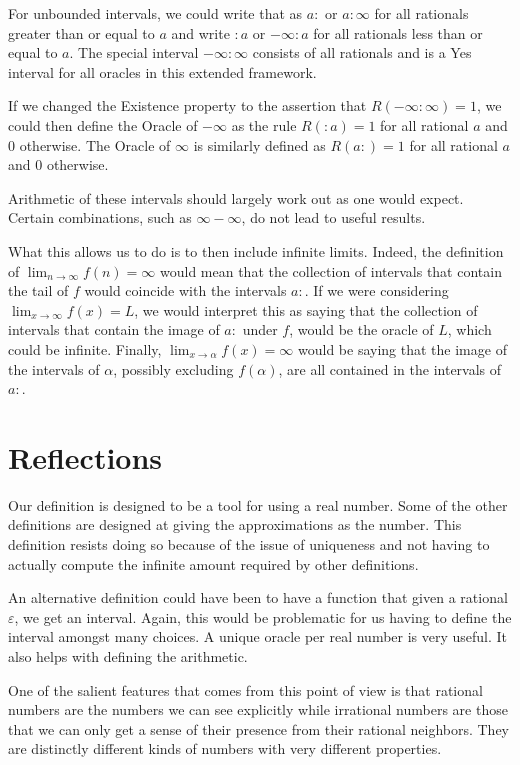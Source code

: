 \documentclass[12pt]{article}
\theoremstyle{remark}
\begin{document}
For unbounded intervals, we could write that as $a:$ or $a:\infty$ for all rationals greater than or equal to $a$ and write $:a$ or $-\infty:a$ for all rationals less than or equal to $a$. The special interval $-\infty:\infty$ consists of all rationals and is a Yes interval for all oracles in this extended framework. 

If we changed the Existence property to the assertion that $R(-\infty:\infty)=1$, we could then define the Oracle of $-\infty$ as the rule $R(:a) = 1$ for all rational $a$ and 0 otherwise. The Oracle of $\infty$ is similarly defined as $R(a:)=1$  for all rational $a$ and 0 otherwise. 

Arithmetic of these intervals should largely work out as one would expect. Certain combinations, such as $\infty-\infty$, do not lead to useful results. 

What this allows us to do is to then include infinite limits. Indeed, the definition of $\lim_{n\to \infty} f(n) = \infty$ would mean that the collection of intervals that contain the tail of $f$ would coincide with the intervals $a:$. If we were considering $\lim_{x \to \infty} f(x) = L$, we would interpret this as saying that the collection of intervals that contain the image of $a:$ under $f$, would be the oracle of $L$, which could be infinite.  Finally, $\lim_{x \to \alpha} f(x) = \infty$ would be saying that the image of the intervals of $\alpha$, possibly excluding $f(\alpha)$, are all contained in the intervals of $a:$. 


\section{Reflections}



Our definition is designed to be a tool for using a real number. Some of the other definitions are designed at giving the approximations as the number. This definition resists doing so because of the issue of uniqueness and not having to actually compute the infinite amount required by other definitions. 

An alternative definition could have been to have a function that given a rational $\varepsilon$, we get an interval. Again, this would be problematic for us having to define the interval amongst many choices. A unique oracle per real number is very useful. It also helps with defining the arithmetic. 

One of the salient features that comes from this point of view is that rational numbers are the numbers we can see explicitly while irrational numbers are those that we can only get a sense of their presence from their rational neighbors. They are distinctly different kinds of numbers with very different properties. 
\end{document}
